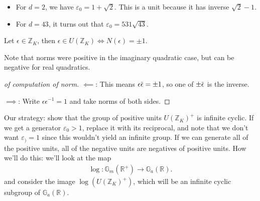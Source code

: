 \begin{example}

\envlist

\begin{itemize}
\item
  For \(d=2\), we have \(\varepsilon_0 = 1 + \sqrt{2}\). This is a unit
  because it has inverse \(\sqrt{2} -1\).
\item
  For \(d=43\), it turns out that \(\varepsilon_0 = 531 \sqrt{43}\).
\end{itemize}

\end{example}

\begin{lemma}

Let \(\epsilon\in {\mathbb{Z}}_K\), then
\(\epsilon \in U({\mathbb{Z}}_K) \iff N( \epsilon) = \pm 1\).

\end{lemma}

\begin{remark}

Note that norms were positive in the imaginary quadratic case, but can
be negative for real quadratics.

\end{remark}

\begin{proof}[of computation of norm]

\(\impliedby\): This means
\(\epsilon \mkern 1.5mu\overline{\mkern-1.5mu \epsilon \mkern-1.5mu}\mkern 1.5mu = \pm 1\),
so one of
\(\pm \mkern 1.5mu\overline{\mkern-1.5mu\epsilon\mkern-1.5mu}\mkern 1.5mu\)
is the inverse.

\(\implies\): Write \(\epsilon \epsilon ^{-1} = 1\) and take norms of
both sides.

\end{proof}

\begin{remark}

Our strategy: show that the group of positive units
\(U({\mathbb{Z}}_K)^+\) is infinite cyclic. If we get a generator
\(\varepsilon_0 > 1\), replace it with its reciprocal, and note that we
don't want \(\varepsilon_) = 1\) since this wouldn't yield an infinite
group. If we can generate all of the positive units, all of the negative
units are negatives of positive units. How we'll do this: we'll look at
the map
\begin{align*}
\log: {\mathbb{G}}_m({\mathbb{R}}^+) \xrightarrow{} {\mathbb{G}}_a({\mathbb{R}})
.\end{align*}
and consider the image \(\log( U( {\mathbb{Z}}_K)^+)\), which will be an
infinite cyclic subgroup of \({\mathbb{G}}_a({\mathbb{R}})\).

\end{remark}


